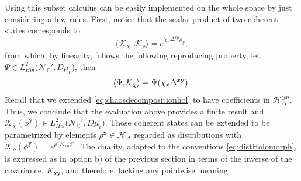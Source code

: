 \documentclass{elsarticle}%
\begin{document}
  Using this subset calculus  can be easily  implemented on the whole space by just considering a few rules.  First, notice that
the scalar product of two coherent states corresponds to
\begin{equation*}
    \langle \mathcal{K}_{\chi},\mathcal{K}_{\rho}\rangle = e^{{\bar{\chi}_x\Delta^{xy}\rho_y}},
\end{equation*}
from which, by linearity,  follows the following reproducing property,  let $\Psi\in L^2_{Hol}\big({\mathcal{N}_{\mathbb{C}}'},D\mu_c\big)$, then 
\begin{equation*}
    \langle\Psi, \mathcal{K}_{\chi}\rangle= \Psi(\chi_{x}\Delta^{x \mathbf{y}}). \\
\end{equation*}
  Recall that  we extended \eqref{eq:chaosdecompositionhol} to have coefficients in $\mathcal{H}_\Delta^{\otimes n}$. Thus, we conclude that the evaluation above provides a finite result and $ \mathcal{K}_{\chi}(\phi^{\mathbf{y}})\in L^2_{Hol}\big({\mathcal{N}_{\mathbb{C}}'},D\mu_c\big)$. Those coherent states can be extended to be parametrized by elements $\rho^{\mathbf{x}}\in \mathcal{H}_\Delta$ regarded as distributions with $ \mathcal{K}_\rho(\phi^{\mathbf{y}})=e^{\bar\rho^xK_{xy}\phi^x}$. The duality, adapted to the conventions \eqref{eq:distHolomorph}, is expressed as in option b) of the previous section in terms of the inverse of the covariance, $K_{\mathbf{xy}}$, and therefore, lacking any pointwise meaning. 
 
\end{document}

